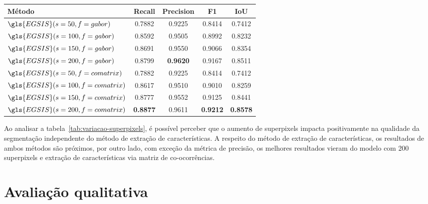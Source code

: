 \begin{table}[!h]
    \centering
  \begin{tabular}{lcccc}
    \toprule
    \textbf{Método}                  & \textbf{Recall} & \textbf{Precision} & \textbf{F1}     & \textbf{IoU}    \\
    \midrule \midrule
    $\gls{EGSIS}(s=50, f=gabor)$     & 0.7882          & 0.9225             & 0.8414          & 0.7412          \\
    $\gls{EGSIS}(s=100, f=gabor)$    & 0.8592          & 0.9505             & 0.8992          & 0.8232          \\
    $\gls{EGSIS}(s=150, f=gabor)$    & 0.8691          & 0.9550             & 0.9066          & 0.8354          \\
    $\gls{EGSIS}(s=200, f=gabor)$    & 0.8799          & \textbf{0.9620}    & 0.9167          & 0.8511          \\
    $\gls{EGSIS}(s=50, f=comatrix)$  & 0.7882          & 0.9225             & 0.8414          & 0.7412          \\
    $\gls{EGSIS}(s=100, f=comatrix)$ & 0.8617          & 0.9510             & 0.9010          & 0.8259          \\
    $\gls{EGSIS}(s=150, f=comatrix)$ & 0.8777          & 0.9552             & 0.9125          & 0.8441          \\
    $\gls{EGSIS}(s=200, f=comatrix)$ & \textbf{0.8877} & 0.9611             & \textbf{0.9212} & \textbf{0.8578} \\
    \bottomrule
  \end{tabular}
  \Fonte{\fonteautor}
\end{table}

Ao analisar a tabela~\ref{tab:variacao-superpixels}, é possível
perceber que o aumento de superpixels impacta positivamente na
qualidade da segmentação independente do método de extração de
características. A respeito do método de extração de características,
os resultados de ambos métodos são próximos, por outro lado, com
exceção da métrica de precisão, os melhores resultados vieram do
modelo com 200 superpixels e extração de características via matriz de
co-ocorrências.


\section{Avaliação qualitativa}

